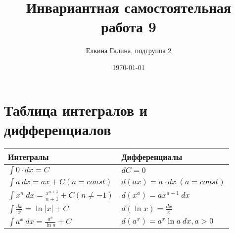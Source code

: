 \documentclass[a4paper,12pt]{article}
\author{Елкина Галина, подгруппа 2}
\title{Инвариантная самостоятельная работа 9}
\date{\today}
\begin{document}
\maketitle
\newpage

\section*{Таблица интегралов и дифференциалов}

\begin{tabular}{|l|l|}
    \hline
    \textbf{Интегралы} & \textbf{Дифференциалы} \\
    \hline
    $ \int 0 \cdot dx=C $ & $ dC = 0 $ \\
    \hline
    $ \int a~ dx=ax+C (a=const) $ & $ d(ax) = a \cdot dx~ (a=const) $ \\
    \hline
    $ \int x^n~ dx= \frac{x^{n+1}}{n+1}+C (n \not = -1) $ & $ d(x^a) = ax^{a-1}~ dx $ \\
    \hline
    $ \int \frac{dx}{x} = \ln |x| + C $ & $ d(\ln x) = \frac{dx}{x} $ \\
    \hline
    $ \int a^x~ dx = \frac{a^x}{\ln a} +C $ & $ d(a^x) = a^x \ln a~ dx , a>0 $ \\
    \hline
\end{tabular}
\end{document}
